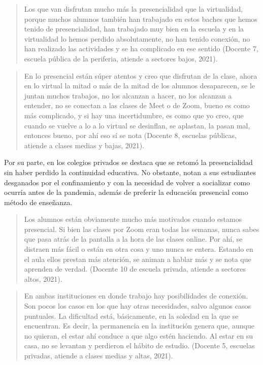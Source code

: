 \documentclass[spanish]{textolivre}
\begin{document}
\begin{quote}
    Los que van disfrutan mucho más la presencialidad que la virtualidad, porque muchos alumnos también han trabajado en estos baches que hemos tenido de presencialidad, han trabajado muy bien en la escuela y en la virtualidad lo hemos perdido absolutamente, no han tenido conexión, no han realizado las actividades y se ha complicado en ese sentido (Docente 7, escuela pública de la periferia, atiende a sectores bajos, 2021).
\end{quote}

\begin{quote}
    En lo presencial están súper atentos y creo que disfrutan de la clase, ahora en lo virtual la mitad o más de la mitad de los alumnos desaparecen, se le juntan muchos trabajos, no los alcanzan a hacer, no los alcanzan a entender, no se conectan a las clases de Meet o de Zoom, bueno es como más complicado, y si hay una incertidumbre, es como que yo creo, que cuando se vuelve a lo a lo virtual se desinflan, se aplastan, la pasan mal, entonces bueno, por ahí eso sí se nota (Docente 8, escuelas públicas, atiende a clases medias y bajas, 2021).
\end{quote}

Por su parte, en los colegios privados se destaca que se retomó la presencialidad sin haber perdido la continuidad educativa. No obstante, notan a sus estudiantes desganados por el confinamiento y con la necesidad de volver a socializar como ocurría antes de la pandemia, además de preferir la educación presencial como método de enseñanza.

\begin{quote}
    Los alumnos están obviamente mucho más motivados cuando estamos presencial. Si bien las clases por Zoom eran todas las semanas, nunca sabes que pasa atrás de la pantalla a la hora de las clases online. Por ahí, se distraen más fácil o están en otra cosa y uno nunca se entera. Estando en el aula ellos prestan más atención, se animan a hablar más y se nota que aprenden de verdad. (Docente 10 de escuela privada, atiende a sectores altos, 2021).
\end{quote}

\begin{quote}
    En ambas instituciones en donde trabajo hay posibilidades de conexión. Son pocos los casos en los que hay otras necesidades, salvo algunos casos puntuales. La dificultad está, básicamente, en la soledad en la que se encuentran. Es decir, la permanencia en la institución genera que, aunque no quieran, el estar ahí conduce a que algo estén haciendo. Al estar en su casa, no se levantan y perdieron el hábito de estudio.  (Docente 5, escuelas privadas, atiende a clases medias y altas, 2021).
\end{quote}
\end{document}
